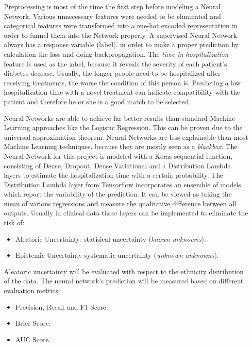 \documentclass[journal]{IEEEtran}
\begin{document}
Preprocessing is most of the time the first step before modeling a Neural Network. Various unnecessary features were needed to be eliminated and categorical features were transformed into a one-hot encoded representation in order to funnel them into the Network properly. A supervised Neural Network always has a response variable (label), in order to make a proper prediction by calculation the loss and doing backpropagation. The \textit{time in hospitalization} feature is used as the label, because it reveals the severity of each patient's diabetes decease. Usually, the longer people need to be hospitalized after receiving treatments, the worse the condition of this person is. Predicting a low hospitalization time with a novel treatment can indicate compatibility with the patient and therefore he or she is a good match to be selected. 

Neural Networks are able to achieve far better results than standard Machine Learning approaches like the Logistic Regression. This can be proven due to the universal approximation theorem. Neural Networks are less explainable than most Machine Learning techniques, because they are mostly seen as a \textit{blackbox}. The Neural Network for this project is modeled with a Keras sequential function, consisting of Dense, Dropout, Dense Variational and a Distribution Lambda layers to estimate the hospitalization time with a certain probability. The Distribution Lambda layer from Tensorflow incorporates an ensemble of models which report the variability of the prediction. It can be viewed as taking the mean of various regressions and measure the qualitative difference between all outputs. Usually in clinical data those layers can be implemented to eliminate the risk of: \\

\begin{itemize}
	\item Aleatoric Uncertainty: statisical uncertainty (\textit{known unknowns}).
	\item Epistemic Uncertainty systematic uncertainty (\textit{unknown unknowns}).\\
\end{itemize}

Aleatoric uncertainty will be evaluated with respect to the ethnicity distribution of the data. The neural network's prediction will be measured based on different evaluation metrics: \\

\begin{itemize}
	\item Precision, Recall and F1 Score.
	\item Brier Score.
	\item AUC Score. \\
\end{itemize}
\end{document}
